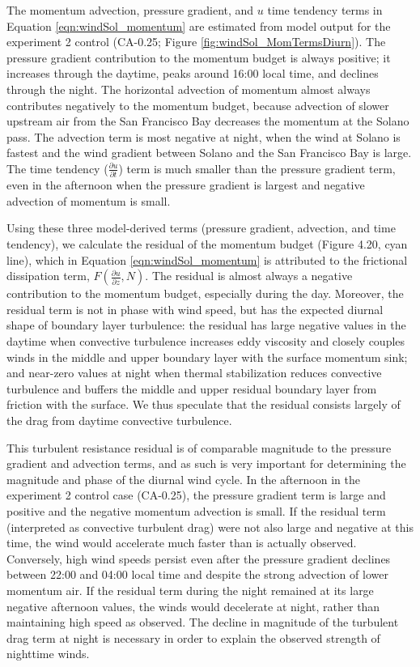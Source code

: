 The momentum advection, pressure gradient, and $u$ time tendency terms in Equation \ref{eqn:windSol_momentum} are estimated from model output for the experiment 2 control (CA-0.25; Figure \ref{fig:windSol_MomTermsDiurn}).  The pressure gradient contribution to the momentum budget is always positive; it increases through the daytime, peaks around 16:00 local time, and declines through the night.  The horizontal advection of momentum almost always contributes negatively to the momentum budget, because advection of slower upstream air from the San Francisco Bay decreases the momentum at the Solano pass.  The advection term is most negative at night, when the wind at Solano is fastest and the wind gradient between Solano and the San Francisco Bay is large. The time tendency ($\frac{\partial u}{\partial t}$) term is much smaller than the pressure gradient term, even in the afternoon when the pressure gradient is largest and negative advection of momentum is small.

Using these three model-derived terms (pressure gradient, advection, and time tendency), we calculate the residual of the momentum budget (Figure  4.20, cyan line), which in Equation \ref{eqn:windSol_momentum} is attributed to the frictional dissipation term, $F\left(\frac{\partial u}{\partial z}, N\right)$. The residual is almost always a negative contribution to the momentum budget, especially during the day.  Moreover, the residual term is not in phase with wind speed, but has the expected diurnal shape of boundary layer turbulence: the residual has large negative values in the daytime when convective turbulence increases eddy viscosity and closely couples winds in the middle and upper boundary layer with the surface momentum sink; and near-zero values at night when thermal stabilization reduces convective turbulence and buffers the middle and upper residual boundary layer from friction with the surface.  We thus speculate that the residual consists largely of the drag from daytime convective turbulence.

This turbulent resistance residual is of comparable magnitude to the pressure gradient and advection terms, and as such is very important for determining the magnitude and phase of the diurnal wind cycle.  In the afternoon in the experiment 2 control case (CA-0.25), the pressure gradient term is large and positive and the negative momentum advection is small.  If the residual term (interpreted as convective turbulent drag) were not also large and negative at this time, the wind would accelerate much faster than is actually observed.  Conversely, high wind speeds persist even after the pressure gradient declines between 22:00 and 04:00 local time and despite the strong advection of lower momentum air.  If the residual term during the night remained at its large negative afternoon  values, the winds would decelerate at night, rather than maintaining high speed as observed.  The decline in magnitude of the turbulent drag term at night is necessary in order to explain the observed strength of nighttime winds.

